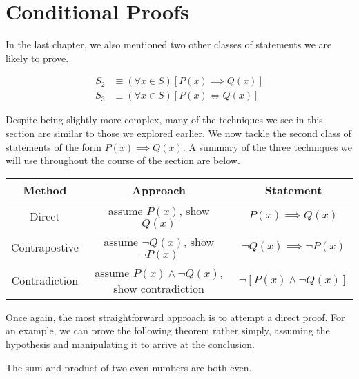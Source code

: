 \documentclass[twoside]{report}
\begin{document}
\section{Conditional Proofs}

In the last chapter, we also mentioned two other classes of statements we are likely to prove.

\begin{align*}
	S_2 &\equiv (\forall x \in S)[P(x) \implies Q(x)] \\
	S_3 &\equiv (\forall x \in S)[P(x) \iff Q(x)]
\end{align*}

Despite being slightly more complex, many of the techniques we see in this section are similar to those we explored earlier. We now tackle the second class of statements of the form $P(x) \implies Q(x)$. A summary of the three techniques we will use throughout the course of the section are below.

\begin{center}
	\begin{tabular}{ccc}
		\toprule
		Method & Approach & Statement \\
		\midrule
		Direct & assume $P(x)$, show $Q(x)$ & $P(x) \implies Q(x)$ \\
		Contrapostive & assume $\neg Q(x)$, show $\neg P(x)$ & $\neg Q(x) \implies \neg P(x)$ \\
		Contradiction & assume $P(x) \wedge \neg Q(x)$, show contradiction & $\neg[P(x) \wedge \neg Q(x)]$ \\
		\bottomrule
	\end{tabular}
\end{center}
\vspace{\baselineskip}

Once again, the most straightforward approach is to attempt a direct proof. For an example, we can prove the following theorem rather simply, assuming the hypothesis and manipulating it to arrive at the conclusion.

\vspace{\baselineskip}
\begin{theorem}
	The sum and product of two even numbers are both even. 
\end{theorem}
\end{document}
